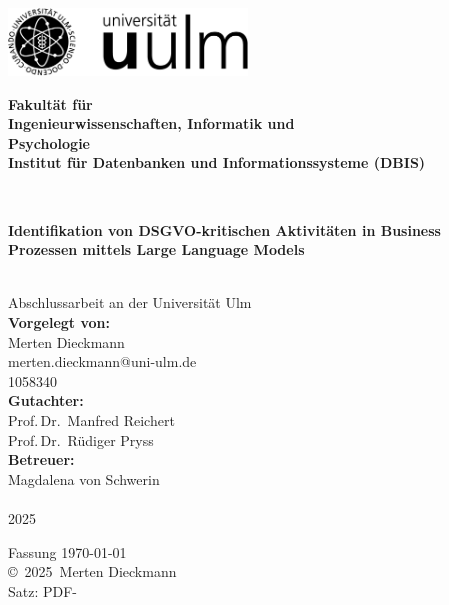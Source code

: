\documentclass[a4paper,12pt,
headsepline,           %
oneside,               %
pointlessnumbers,      %
bibtotoc,              %
BCOR15mm               %
]{scrbook}
\makeatletter
\newcommand{\fullname}{Merten Dieckmann}
\newcommand{\email}{merten.dieckmann@uni-ulm.de}
\newcommand{\titel}{Identifikation von DSGVO-kritischen Aktivitäten in Business Prozessen mittels Large Language Models}
\newcommand{\jahr}{2025}
\newcommand{\matnr}{1058340}
\newcommand{\gutachterA}{Prof.\,Dr.\, Manfred Reichert}
\newcommand{\gutachterB}{Prof.\,Dr.\, Rüdiger Pryss}
\newcommand{\betreuer}{Magdalena von Schwerin}
\newcommand{\fakultaet}{Ingenieurwissenschaften, Informatik und\\Psychologie}
\newcommand{\institut}{Institut für Datenbanken und Informationssysteme (DBIS)}
\makeatother
\begin{document}
\frontmatter

\thispagestyle{empty}
\begin{addmargin*}[4mm]{-10mm}

\hfill
\includegraphics[height=1.8cm]{images/logo_uulm_sw.png}\\[1em]

{\footnotesize
\hspace*{115mm}\parbox[t]{35mm}{\bfseries Fakultät für\\
\fakultaet\\
\mdseries \institut}\\[2cm]

\parbox{140mm}{\bfseries \LARGE \titel}\\[2.5em]
{\footnotesize Abschlussarbeit an der Universität Ulm}\\[3em]

{\footnotesize \bfseries Vorgelegt von:}\\
{\footnotesize \fullname\\ \email}\\ \matnr\\[2em]
{\footnotesize \bfseries Gutachter:}\\                     
{\footnotesize \gutachterA\\ \gutachterB}\\[2em]
{\footnotesize \bfseries Betreuer:}\\ 
{\footnotesize \betreuer}\\\\
{\footnotesize \jahr}
}
\end{addmargin*}


\clearpage
\thispagestyle{empty}
{ \small
  \flushleft
  Fassung \today \\\vfill
  \copyright~\jahr~\fullname\\[0.5em]
  Satz: PDF-\LaTeXe
}
\end{document}
